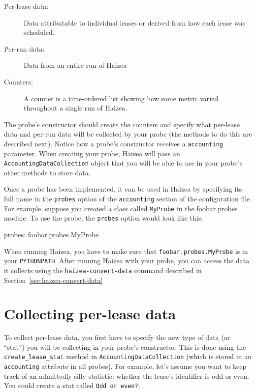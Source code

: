 \begin{description}
\item[Per-lease data:] Data attributable to individual leases or derived from how each lease was scheduled. 
\item[Per-run data:] Data from an entire run of Haizea
\item[Counters:] A counter is a time-ordered list showing how some metric varied throughout a single run of Haizea. 
\end{description}

The probe's constructor should create the counters and specify what per-lease data and per-run data will be collected by your probe (the methods to do this are described next). Notice how a probe's constructor receives a \texttt{accounting} parameter. When creating your probe, Haizea will pass an \texttt{AccountingDataCollection} object that you will be able to use in your probe's other methods to store data.

Once a probe has been implemented, it can be used in Haizea by specifying its full name in the \texttt{probes} option of the \texttt{accounting} section of the configuration file. For example, suppose you created a class called \texttt{MyProbe} in the {foobar.probes} module. To use the probe, the \texttt{probes} option would look like this:

\begin{wideshellverbatim}
probes: foobar.probes.MyProbe
\end{wideshellverbatim}

When running Haizea, you have to make sure that \texttt{foobar.probes.MyProbe} is in your \texttt{PYTHONPATH}. After running Haizea with your probe, you can access the data it collects using the \texttt{haizea-convert-data} command described in Section~\ref{sec:haizea-convert-data}

\section{Collecting per-lease data}

To collect per-lease data, you first have to specify the new type of data (or ``stat'') you will be collecting in your probe's constructor. This is done using the \verb+create_lease_stat+ method in \texttt{AccountingDataCollection} (which is stored in an \texttt{accounting} attribute in all probes). For example, let's assume you want to keep track of an admittedly silly statistic: whether the lease's identifier is odd or even. You could create a stat called \texttt{Odd or even?}:

